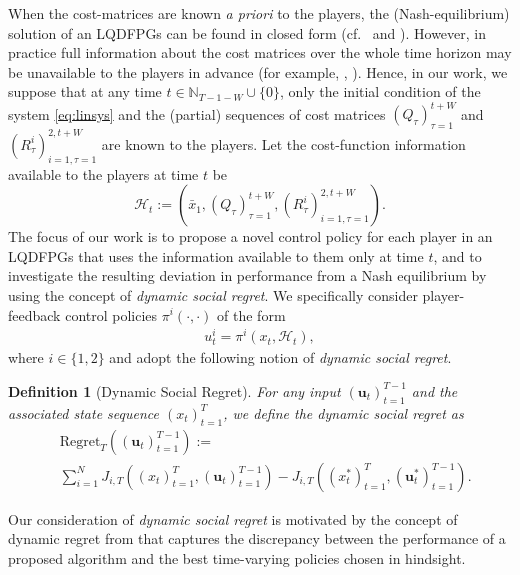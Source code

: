 \documentclass[letterpaper, 10 pt, conference]{ieeeconf}  %
\newtheorem{definition}{Definition}
\begin{document}
When the cost-matrices are known \emph{a priori} to the players, the (Nash-equilibrium) solution of an LQDFPGs can be found in closed form (cf.\ \cite{prasad_structure_2023} and \cite[Chapter 6]{basar_dynamic_1998}).
However, in practice full information about the cost matrices over the whole time horizon may be unavailable to the players in advance (for example, \cite{westenbroek_feedback_2020}, \cite{kouro_model_2009}).
Hence, in our work, we suppose that at any time $t \in \mathbb{N}_{T-1 - W} \cup \{0\}$, only the initial condition of the system \eqref{eq:linsys} and the (partial) sequences of cost matrices $(Q_{\tau})_{\tau=1}^{t+W}$ and $(R_{\tau}^i)_{i=1,\tau=1}^{2,t+W}$ are known to the players.
Let the cost-function information available to the players at time $t$ be
\begin{equation}\label{eq:history}
    \mathcal{H}_{t} := (\bar{x}_{1}, (Q_{\tau})_{\tau=1}^{t+W}, (R_{\tau}^i)_{i=1,\tau=1}^{2,t+W}).
\end{equation}
The focus of our work is to propose a novel control policy for each player in an LQDFPGs that uses the information available to them only at time $t$, and to investigate the resulting deviation in performance from a Nash equilibrium by using the concept of \emph{dynamic social regret}.
We specifically consider player-feedback control policies $\pi^i (\cdot, \cdot)$ of the form
\begin{align*}
    u_t^i = \pi^i(x_t, \mathcal{H}_t),
\end{align*}
where $i \in \{1,2\}$ and adopt the following notion of \emph{dynamic social regret}.

\begin{definition}[Dynamic Social Regret]
For any input $(\mathbf{u}_{t})_{t=1}^{T-1}$ and the associated state sequence $(x_{t})_{t=1}^{T}$, we define the \emph{dynamic social regret} as
\begin{equation}
    \label{eq:regret}
    \begin{split}
        &\text{Regret}_{T}((\mathbf{u}_{t})_{t=1}^{T-1}) := \\
        &\sum_{i=1}^{N} J_{i,T}((x_{t})_{t=1}^{T},(\mathbf{u}_{t})_{t=1}^{T-1}) - J_{i,T}((x_{t}^{*})_{t=1}^{T},(\mathbf{u}_{t}^{*})_{t=1}^{T-1}).
    \end{split}
\end{equation}
\end{definition}

Our consideration of \emph{dynamic social regret} is motivated by the concept of dynamic regret from \cite[Equation (5)]{chen_regret_2023} that captures the discrepancy between the performance of a proposed algorithm and the best time-varying policies chosen in hindsight.
\end{document}
